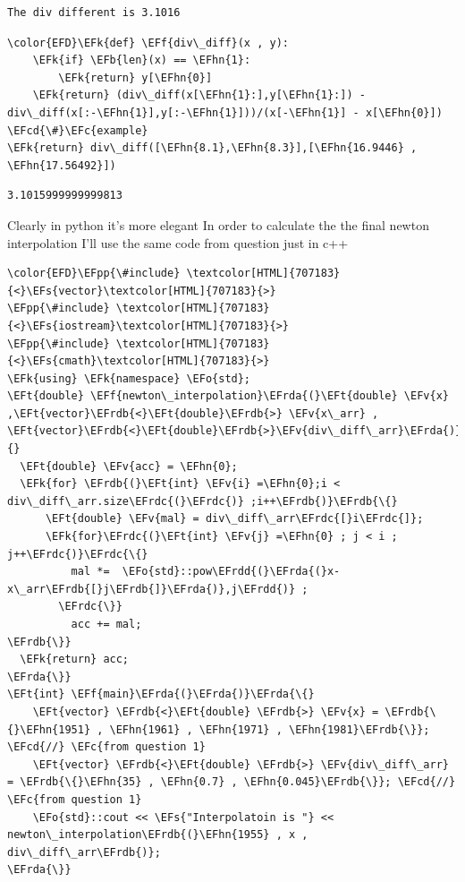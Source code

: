 \documentclass[11pt]{article}
\newcommand{\EFc}[1]{\textcolor{EFc}{#1}} %
\newcommand{\EFcd}[1]{\textcolor{EFcd}{#1}} %
\newcommand{\EFs}[1]{\textcolor{EFs}{#1}} %
\newcommand{\EFk}[1]{\textcolor{EFk}{#1}} %
\newcommand{\EFb}[1]{\textcolor{EFb}{#1}} %
\newcommand{\EFf}[1]{\textcolor{EFf}{#1}} %
\newcommand{\EFv}[1]{\textcolor{EFv}{#1}} %
\newcommand{\EFt}[1]{\textcolor{EFt}{#1}} %
\newcommand{\EFo}[1]{\textcolor{EFo}{#1}} %
\newcommand{\EFpp}[1]{\textcolor{EFpp}{#1}} %
\newcommand{\EFhn}[1]{\textcolor{EFhn}{#1}} %
\newcommand{\EFrda}[1]{\textcolor{EFrda}{#1}} %
\newcommand{\EFrdb}[1]{\textcolor{EFrdb}{#1}} %
\newcommand{\EFrdc}[1]{\textcolor{EFrdc}{#1}} %
\newcommand{\EFrdd}[1]{\textcolor{EFrdd}{#1}} %
\begin{document}
\begin{verbatim}
The div different is 3.1016
\end{verbatim}


\begin{Code}
\begin{Verbatim}
\color{EFD}\EFk{def} \EFf{div\_diff}(x , y):
    \EFk{if} \EFb{len}(x) == \EFhn{1}:
        \EFk{return} y[\EFhn{0}]
    \EFk{return} (div\_diff(x[\EFhn{1}:],y[\EFhn{1}:]) - div\_diff(x[:-\EFhn{1}],y[:-\EFhn{1}]))/(x[-\EFhn{1}] - x[\EFhn{0}])
\EFcd{\#}\EFc{example}
\EFk{return} div\_diff([\EFhn{8.1},\EFhn{8.3}],[\EFhn{16.9446} , \EFhn{17.56492}])
\end{Verbatim}
\end{Code}

\begin{verbatim}
3.1015999999999813
\end{verbatim}


Clearly in python it's more elegant
In order to calculate the the final newton interpolation I'll use the same code from question just in c++

\begin{Code}
\begin{Verbatim}
\color{EFD}\EFpp{\#include} \textcolor[HTML]{707183}{<}\EFs{vector}\textcolor[HTML]{707183}{>}
\EFpp{\#include} \textcolor[HTML]{707183}{<}\EFs{iostream}\textcolor[HTML]{707183}{>}
\EFpp{\#include} \textcolor[HTML]{707183}{<}\EFs{cmath}\textcolor[HTML]{707183}{>}
\EFk{using} \EFk{namespace} \EFo{std};
\EFt{double} \EFf{newton\_interpolation}\EFrda{(}\EFt{double} \EFv{x} ,\EFt{vector}\EFrdb{<}\EFt{double}\EFrdb{>} \EFv{x\_arr} , \EFt{vector}\EFrdb{<}\EFt{double}\EFrdb{>}\EFv{div\_diff\_arr}\EFrda{)}\EFrda{\{}
  \EFt{double} \EFv{acc} = \EFhn{0};
  \EFk{for} \EFrdb{(}\EFt{int} \EFv{i} =\EFhn{0};i < div\_diff\_arr.size\EFrdc{(}\EFrdc{)} ;i++\EFrdb{)}\EFrdb{\{}
      \EFt{double} \EFv{mal} = div\_diff\_arr\EFrdc{[}i\EFrdc{]};
      \EFk{for}\EFrdc{(}\EFt{int} \EFv{j} =\EFhn{0} ; j < i ; j++\EFrdc{)}\EFrdc{\{}
          mal *=  \EFo{std}::pow\EFrdd{(}\EFrda{(}x-x\_arr\EFrdb{[}j\EFrdb{]}\EFrda{)},j\EFrdd{)} ;
        \EFrdc{\}}
          acc += mal;
\EFrdb{\}}
  \EFk{return} acc;
\EFrda{\}}
\EFt{int} \EFf{main}\EFrda{(}\EFrda{)}\EFrda{\{}
    \EFt{vector} \EFrdb{<}\EFt{double} \EFrdb{>} \EFv{x} = \EFrdb{\{}\EFhn{1951} , \EFhn{1961} , \EFhn{1971} , \EFhn{1981}\EFrdb{\}}; \EFcd{//} \EFc{from question 1}
    \EFt{vector} \EFrdb{<}\EFt{double} \EFrdb{>} \EFv{div\_diff\_arr} = \EFrdb{\{}\EFhn{35} , \EFhn{0.7} , \EFhn{0.045}\EFrdb{\}}; \EFcd{//} \EFc{from question 1}
    \EFo{std}::cout << \EFs{"Interpolatoin is "} << newton\_interpolation\EFrdb{(}\EFhn{1955} , x , div\_diff\_arr\EFrdb{)};
\EFrda{\}}


\end{Verbatim}
\end{Code}
\end{document}
